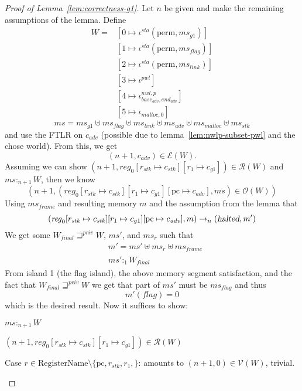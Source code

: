 \documentclass[a4paper]{article}
\newcommand{\update}[2]{[#1 \mapsto #2]}
\newcommand{\var}[1]{\mathit{#1}}
\newcommand{\hs}{\var{ms}}
\newcommand{\ms}{\hs}
\newcommand{\pcreg}{\mathrm{pc}}
\newcommand{\start}{\var{base}}
\newcommand{\addrend}{\var{end}}
\newcommand{\reg}{\var{reg}}
\newcommand{\heap}{\var{mem}}
\newcommand{\adv}{\var{adv}}
\newcommand{\link}{\var{link}}
\newcommand{\stk}{\var{stk}}
\newcommand{\flag}{\var{flag}}
\newcommand{\nwl}{\var{nwl}}
\newcommand{\pwl}{\var{pwl}}
\newcommand{\sta}{\var{sta}}
\newcommand{\halted}{\textsl{halted}}
\newcommand{\futurestr}{\mathbin{\sqsupseteq}^{\var{priv}}}
\newcommand{\heapSat}[3][\heap]{#1 :_{#2} #3}
\newcommand{\memSat}[3][n]{\heapSat[#2]{#1}{#3}}
\newcommand{\codelabel}[1]{\mathit{#1}}
\newcommand{\malloc}{\codelabel{malloc}}
\newcommand{\asmType}{\plaindom{AsmType}}
\newcommand{\plaindom}[1]{\mathrm{#1}}
\newcommand{\RegName}{\plaindom{RegisterName}}
\newcommand{\intr}[2]{\mathcal{#1}}
\newcommand{\valueintr}[1]{\intr{V}{#1}}
\newcommand{\exprintr}[1]{\intr{E}{#1}}
\newcommand{\regintr}[1]{\intr{R}{#1}}
\newcommand{\stdvr}{\valueintr{\asmType}}
\newcommand{\stder}{\exprintr{\asmType}}
\newcommand{\stdrr}{\regintr{\asmType}}
\newcommand{\observations}{\mathcal{O}}
\newcommand{\npair}[2][n]{\left(#1,#2 \right)}
\newcommand{\plainview}[1]{\mathrm{#1}}
\newcommand{\perma}{\plainview{perm}}
\newcommand{\step}[1][]{\rightarrow_{#1}}
\begin{document}
\begin{lemma}
\begin{proof}[Proof of Lemma~\ref{lem:correctness-g1}]
  Let $n$ be given and make the remaining assumptions of the lemma. Define
  \begin{align*}
    W = & [0 \mapsto \iota^\sta (\perma,\ms_{g1})]\\
        & [1 \mapsto \iota^\sta (\perma,\ms_\flag)]\\
        & [2 \mapsto \iota^\sta (\perma,\ms_\link)]\\
        & [3 \mapsto \iota^\pwl]\\
        & [4 \mapsto \iota^{\nwl,p}_{\start_\adv,\addrend_\adv}] \\
        & [5 \mapsto \iota_{\malloc,0}]
  \end{align*}
  \[
    \ms = \ms_{g1} \uplus 
    \ms_\flag \uplus                
    \ms_\link \uplus 
    \ms_\adv \uplus 
    \ms_\malloc \uplus 
    \ms_\stk
  \]
  and use the FTLR on $c_\adv$ (possible due to lemma~\ref{lem:nwlp-subset-pwl} and the chose world). From this, we get
  \[
    \npair[n+1]{c_\adv} \in \stder(W).
  \]
  Assuming we can show $\npair[n+1]{\reg_0\update{r_\stk}{c_\stk}\update{r_1}{c_{g1}}} \in \stdrr(W)$ and $\memSat[n+1]{\ms}{W}$, then we know
  \[
    \npair[n+1]{(\reg_0\update{r_\stk}{c_\stk}\update{r_1}{c_{g1}}\update{\pcreg}{c_\adv},\ms) \in \observations(W)}
  \]
  Using $\ms_{\var{frame}}$ and resulting memory $m$ and the assumption from the lemma that
  \[
    (\reg_0\update{r_\stk}{c_\stk}\update{r_1}{c_{g1}}\update{\pcreg}{c_\adv},m) \step[n] (\halted,m')
  \]
  We get some $W_{\var{final}} \futurestr W$, $\ms'$, and $\ms_r$ such that
  \begin{align*}
    & m' = \ms' \uplus \ms_r \uplus \ms_{\var{frame}}\\
    & \memSat[1]{\ms'}{W_{\var{final}}}
  \end{align*}
  From island 1 (the flag island), the above memory segment satisfaction, and the fact that $W_{\var{final}} \futurestr W$ we get that part of $\ms'$ must be $\ms_\flag$ and thus
  \[
    m'(\flag) = 0
  \]
  which is the desired result. Now it suffices to show:
  \begin{enumproof}
  \item $\memSat[n+1]{\ms}{W}$
  \item $\npair[n+1]{\reg_0\update{r_\stk}{c_\stk}\update{r_1}{c_{g1}}} \in \stdrr(W)$
    \begin{enumproof}
    \item Case $r \in \RegName \setminus \{\pcreg,r_\stk,r_1,\}$: amounts to $\npair[n+1]{0} \in \stdvr(W)$, trivial.

\end{enumproof}
\end{enumproof}
\end{proof}
\end{lemma}
\end{document}
